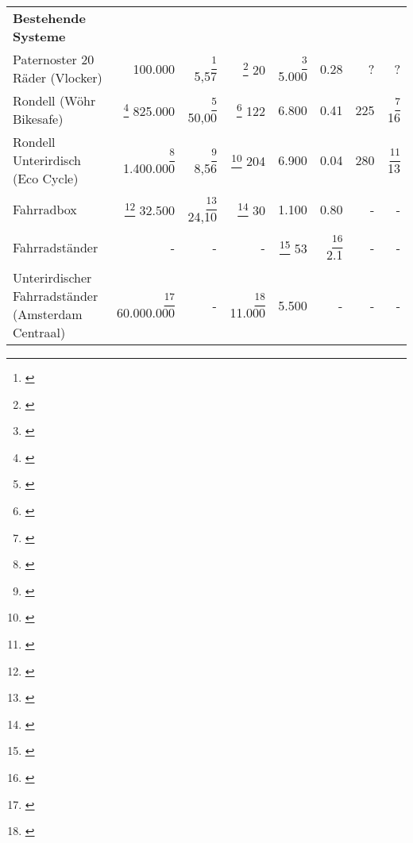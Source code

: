 \begin{landscape}
\begin{table}
\begin{tabular}{p{}rrrrrrr}
      \textbf{Bestehende Systeme}                                                                                                                                                                                                                                                                                                                                                                                 \\
      Paternoster 20 Räder (Vlocker)                     & 100.000                                               & \footnote{\cite{vlocker_fläche,parkplatz_größe}} 5,57 & \footnote{\cite{vlocker_kapazität}} 20          & \footnote{\cite{vlocker_preis}} 5.000 & 0.28                                       & ?                                                & ?                                            \\
      Rondell (Wöhr Bikesafe)                            & \footnote{\cite{richtpreisangebot}} 825.000           & \footnote{\cite{wöhr_fläche}} 50,00                   & \footnote{\cite{richtpreisangebot}} 122         & 6.800                                 & 0.41                                       & 225                                              & \footnote{\cite{wöhr_time}} 16               \\
      Rondell Unterirdisch (Eco Cycle)                   & \footnote{\cite{ecocycle_cost}} 1.400.000             & \footnote{\cite{ecocycle_giken}} 8,56                 & \footnote{\cite{ecocycle_giken}} 204            & 6.900                                 & 0.04                                       & 280                                              & \footnote{\cite{ecocycle_specifications}} 13 \\
      Fahrradbox                                         & \footnote{\cite{box_angebot_orion}} 32.500            & \footnote{\cite{box_angebot_orion}} 24,10             & \footnote{\cite{box_angebot_orion}} 30          & 1.100                                 & 0.80                                       & -                                                & -                                            \\
      Fahrradständer                                     & -                                                     & -                                                     & -                                               & \footnote{\cite{ständer_preis}} 53    & \footnote{\cite{leitfaden_vorarlberg}} 2.1 & -                                                & -                                            \\
      Unterirdischer Fahrradständer (Amsterdam Centraal) & \footnote{\cite{ständer_unter}} 60.000.000            & -                                                     & \footnote{\cite{ständer_unter}} 11.000          & 5.500                                 & -                                          & -                                                & -                                            \\


\end{tabular}
\end{table}
\end{landscape}
